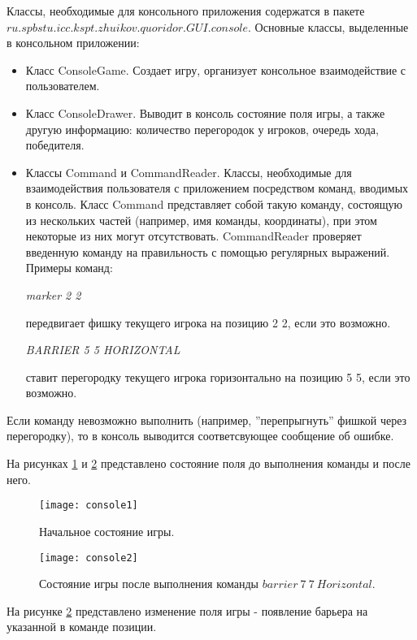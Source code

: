 \documentclass[a4paper]{article}
\begin{document}
\noindent Классы, необходимые для консольного приложения содержатся в пакете $ ru.spbstu.icc.kspt.zhuikov.quoridor.GUI.console$.
Основные классы, выделенные в консольном приложении:
\begin{itemize}
\item Класс ConsoleGame. Создает игру, организует консольное взаимодействие с пользователем. 
\item Класс ConsoleDrawer. Выводит в консоль состояние поля игры, а также другую информацию: количество перегородок у игроков, очередь хода, победителя.
\item Классы Command и CommandReader. Классы, необходимые для взаимодействия пользователя с приложением посредством команд, вводимых в консоль. Класс Command представляет собой такую команду, состоящую из нескольких частей (например, имя команды, координаты), при этом некоторые из них могут отсутствовать. CommandReader проверяет введенную команду на правильность с помощью регулярных выражений. Примеры команд:
\begin{center}
\textit{marker 2 2} 
\end{center} передвигает фишку текущего игрока на позицию 2 2, если это возможно. 
\begin{center}
\textit{BARRIER 5 5 HORIZONTAL} 
\end{center} 
ставит перегородку текущего игрока горизонтально на позицию 5 5, если это возможно. 
\end{itemize}

Если команду невозможно выполнить (например, ''перепрыгнуть'' фишкой через перегородку), то в консоль выводится соответсвующее сообщение об ошибке.

На рисунках \ref{pic:console1} и \ref{pic:console2} представлено состояние поля до выполнения команды и после него. 

\begin{figure}[H]
	\begin{center}
		\texttt{[image: console1]}
		\caption{Начальное состояние игры.} 
		\label{pic:console1} %
	\end{center}
\end{figure}

\begin{figure}[H]
	\begin{center}
		\texttt{[image: console2]}
		\caption{Состояние игры после выполнения команды $barrier~7~7~Horizontal$.} 
		\label{pic:console2} %
	\end{center}
\end{figure}
На рисунке \ref{pic:console2} представлено изменение поля игры - появление барьера на указанной в команде позиции.
\end{document}
